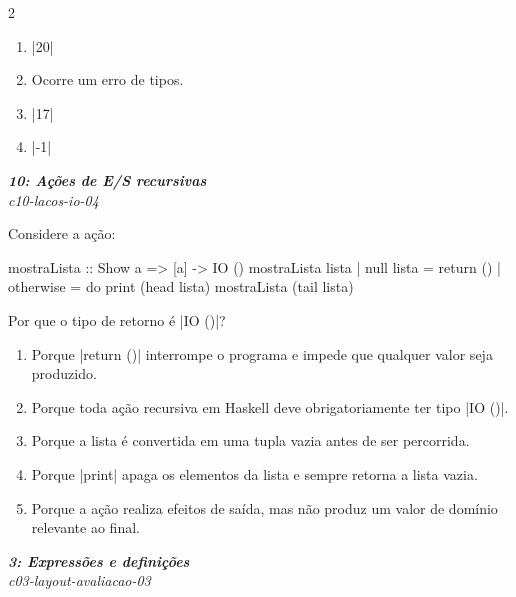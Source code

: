 \documentclass[a4paper,10pt,brazil]{article}
\begin{document}
\begin{multicols}{2}
\begin{enumerate}
  \item \haskellinline|20|

  \item Ocorre um erro de tipos.

  \item \haskellinline|17|

  \item \haskellinline|-1|


\end{enumerate}

\begin{flushright}
  \footnotesize
  \textit{\textbf{10: Ações de E/S recursivas}}\\
  \textit{c10-lacos-io-04}\\

\end{flushright}
Considere a ação:

\begin{haskellcode}
mostraLista :: Show a => [a] -> IO ()
mostraLista lista
  | null lista = return ()
  | otherwise = do
      print (head lista)
      mostraLista (tail lista)
\end{haskellcode}

Por que o tipo de retorno é \haskellinline|IO ()|?

\begin{enumerate}
  \item Porque \haskellinline|return ()| interrompe o programa e impede que qualquer valor seja produzido.

  \item Porque toda ação recursiva em Haskell deve obrigatoriamente ter tipo \haskellinline|IO ()|.

  \item Porque a lista é convertida em uma tupla vazia antes de ser percorrida.

  \item Porque \haskellinline|print| apaga os elementos da lista e sempre retorna a lista vazia.

  \item Porque a ação realiza efeitos de saída, mas não produz um valor de domínio relevante ao final.


\end{enumerate}

\begin{flushright}
  \footnotesize
  \textit{\textbf{3: Expressões e definições}}\\
  \textit{c03-layout-avaliacao-03}\\


\end{flushright}
\end{multicols}
\end{document}
